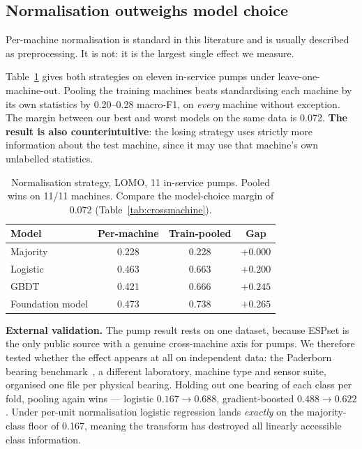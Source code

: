 \documentclass[conference,a4paper,10pt]{IEEEtran}
\begin{document}
\subsection{Normalisation outweighs model choice}
\label{sec:norm}
Per-machine normalisation is standard in this literature and is usually described
as preprocessing. It is not: it is the largest single effect we measure.

Table~\ref{tab:norm} gives both strategies on eleven in-service pumps under
leave-one-machine-out. Pooling the training machines beats standardising each
machine by its own statistics by 0.20--0.28 macro-F1, on \emph{every} machine
without exception. The margin between our best and worst models on the same data
is 0.072. \textbf{The result is also counterintuitive}: the losing strategy uses
strictly more information about the test machine, since it may use that machine's
own unlabelled statistics.

\begin{table}[t]
\caption{Normalisation strategy, LOMO, 11 in-service pumps. Pooled wins on 11/11
machines. Compare the model-choice margin of 0.072 (Table~\ref{tab:crossmachine}).}
\label{tab:norm}
\centering
\small
\begin{tabular}{lccc}
\toprule
Model & Per-machine & Train-pooled & Gap \\
\midrule
Majority & 0.228 & 0.228 & $+0.000$ \\
Logistic & 0.463 & 0.663 & $+0.200$ \\
GBDT     & 0.421 & 0.666 & $+0.245$ \\
Foundation model & 0.473 & 0.738 & $\mathbf{+0.265}$ \\
\bottomrule
\end{tabular}
\end{table}

\textbf{External validation.} The pump result rests on one dataset, because
ESPset is the only public source with a genuine cross-machine axis for pumps. We
therefore tested whether the effect appears at all on independent data: the
Paderborn bearing benchmark~\cite{lessmeier2016}, a different laboratory, machine
type and sensor suite, organised one file per physical bearing. Holding out one
bearing of each class per fold, pooling again wins --- logistic $0.167 \to 0.688$,
gradient-boosted $0.488 \to 0.622$. Under per-unit normalisation logistic
regression lands \emph{exactly} on the majority-class floor of 0.167, meaning the
transform has destroyed all linearly accessible class information.
\end{document}
